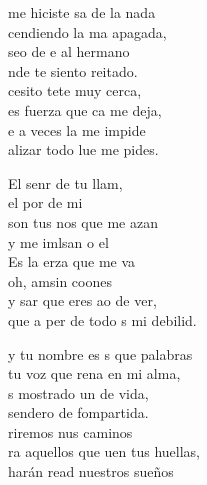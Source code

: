 \begin{cancion}%
	 me hiciste sa de la nada\\
	cendiendo la ma apagada,\\
	seo de e al hermano\\
	nde te siento reitado.\\
	\jump
	cesito tete muy cerca,\\
	es fuerza que ca me deja,\\
	e a veces la  me impide\\
	alizar todo lue me pides. \jump\\
	\begin{chorus}%
		El senr de tu llam,\\
		el por de mi \\
		son tus nos que me azan\\
		y me imlsan o el  \\
		Es la erza que me va\\
		oh,  amsin coones\\
		y sar que eres ao de ver,\\
		que a per de todo s mi debilid.\jump\\
	\end{chorus}%
	y tu nombre es s que palabras\\
	 tu voz que rena en mi alma,\\
	s mostrado un  de vida,\\
	 sendero de fompartida.\\
	\jump
	riremos nus caminos \\
	ra aquellos que uen tus huellas,\\
	harán read nuestros sueños\\

\end{cancion}
